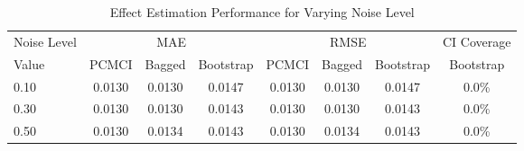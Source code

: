 \begin{table}[htbp]
\centering
\caption{Effect Estimation Performance for Varying Noise Level}
\label{tab:noise_performance}
\begin{tabular}{l|ccc|ccc|c}
\hline
Noise Level & \multicolumn{3}{c|}{MAE} & \multicolumn{3}{c|}{RMSE} & CI Coverage \\
 Value & PCMCI & Bagged & Bootstrap & PCMCI & Bagged & Bootstrap & Bootstrap \\
\hline
0.10 & 0.0130 & 0.0130 & 0.0147 & 0.0130 & 0.0130 & 0.0147 & 0.0\% \\
0.30 & 0.0130 & 0.0130 & 0.0143 & 0.0130 & 0.0130 & 0.0143 & 0.0\% \\
0.50 & 0.0130 & 0.0134 & 0.0143 & 0.0130 & 0.0134 & 0.0143 & 0.0\% \\
\hline
\end{tabular}
\end{table}
